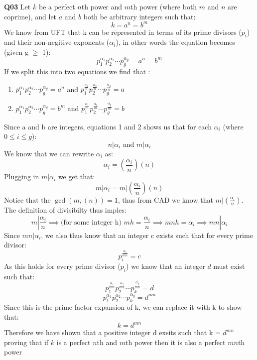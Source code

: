 \documentclass[11pt]{article}
\begin{document}
\textbf{Q03} Let $k$ be a perfect $n$th power and $m$th power (where both $m$ and $n$ are coprime), and let $a$ and $b$ both be arbitrary integers such that:
\[   k = a^n= b^m  \] 
We know from UFT that k can be represented in terms of its prime divisors ($p_i$) and their non-negitive exponents ($\alpha_i$), in other words the equation becomes (given g $\geq$ 1):
\[   p_1^{\alpha_1}p_2^{\alpha_2}\cdots p_g^{\alpha_g} = a^n = b^m \] 
If we split this into two equations we find that :
\begin{enumerate}
\item $p_1^{\alpha_1}p_2^{\alpha_2}\cdots p_g^{\alpha_g} = a^n$ and  $p_1^{\frac{\alpha_1}{n}}p_2^{\frac{\alpha_2}{n}}\cdots p_g^{\frac{\alpha_g}{n}} = a$
\item $p_1^{\alpha_1}p_2^{\alpha_2}\cdots p_g^{\alpha_g} = b^m$ and  $p_1^{\frac{\alpha_1}{m}}p_2^{\frac{\alpha_2}{m}}\cdots p_g^{\frac{\alpha_g}{m}} = b$
\end{enumerate}
Since a and b are integers, equations 1 and 2 shows us that for each $\alpha_i $ (where $0\leq i \leq g$):
\[ n|\alpha_i  \text{ and } m|\alpha_i \]
 We know that we can rewrite $\alpha_i$ as:
\[  \alpha_i = (\frac{\alpha_i}{n})(n) \]
Plugging in  $m|\alpha_i$ we get that:
\[  m|\alpha_i = m|(\frac{\alpha_i}{n})(n) \]
Notice that the $\gcd(m,(n)) = 1$, thus from CAD we know that $m|(\frac{\alpha_i}{n})$. The definition of divisibilty thus imples:
\[  m|\frac{\alpha_i}{n} \implies \text{(for some integer h) } mh = \frac{\alpha_i}{n}  \implies mnh = \alpha_i \implies mn | \alpha_i  \]
Since $mn | \alpha_i$, we also thus know that an integer c exists such that for every prime divisor:
\[ p_i^{\frac{\alpha_i}{mn}} = c \]
As this holds for every prime divisor ($p_i$) we know that an integer $d$ must exist such that:
\[ p_1^{\frac{\alpha_1}{mn}}p_2^{\frac{\alpha_2}{mn}}\cdots p_k^{\frac{\alpha_g}{mn}} = d \]
\[ p_1^{\alpha_1}p_2^{\alpha_2}\cdots p_k^{\alpha_g} = d^{mn} \]
Since this is the prime factor expansion of k, we can replace it with k to show that:
\[ k = d^{mn} \]
Therefore we have shown that a positive integer d exsits such that k = $ d^{mn}$ proving that if $k$ is a perfect $n$th and $m$th power then it is also a perfect $mn$th power
\end{document}

